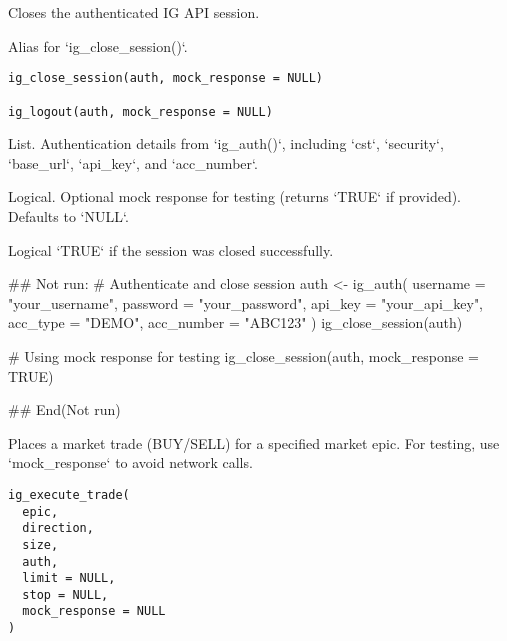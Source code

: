 \documentclass[a4paper]{book}
\begin{document}
%
\begin{Description}
Closes the authenticated IG API session.

Alias for `ig\_close\_session()`.
\end{Description}
%
\begin{Usage}
\begin{verbatim}
ig_close_session(auth, mock_response = NULL)

ig_logout(auth, mock_response = NULL)
\end{verbatim}
\end{Usage}
%
\begin{Arguments}
\begin{ldescription}
\item[\code{auth}] List. Authentication details from `ig\_auth()`, including `cst`, `security`, `base\_url`, `api\_key`, and `acc\_number`.

\item[\code{mock\_response}] Logical. Optional mock response for testing (returns `TRUE` if provided). Defaults to `NULL`.
\end{ldescription}
\end{Arguments}
%
\begin{Value}
Logical `TRUE` if the session was closed successfully.
\end{Value}
%
\begin{Examples}
\begin{ExampleCode}
## Not run: 
# Authenticate and close session
auth <- ig_auth(
  username = "your_username",
  password = "your_password",
  api_key = "your_api_key",
  acc_type = "DEMO",
  acc_number = "ABC123"
)
ig_close_session(auth)

# Using mock response for testing
ig_close_session(auth, mock_response = TRUE)

## End(Not run)

\end{ExampleCode}
\end{Examples}
%
\begin{Description}
Places a market trade (BUY/SELL) for a specified market epic. For testing, use `mock\_response` to avoid network calls.
\end{Description}
%
\begin{Usage}
\begin{verbatim}
ig_execute_trade(
  epic,
  direction,
  size,
  auth,
  limit = NULL,
  stop = NULL,
  mock_response = NULL
)
\end{verbatim}
\end{Usage}
\end{document}
